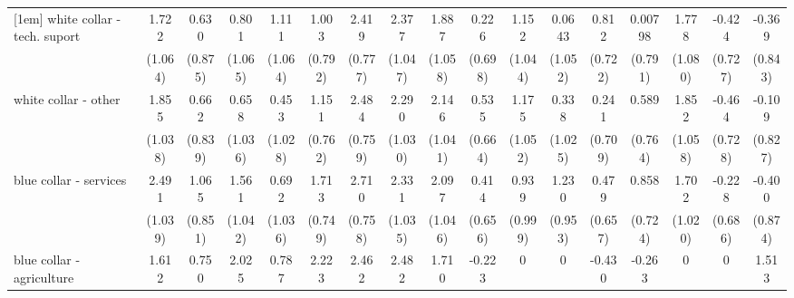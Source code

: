 {\begin{tabular}{l*{16}{c}}
[1em]
white collar - tech. suport&       1.722         &       0.630         &       0.801         &       1.111         &       1.003         &       2.419\sym{**} &       2.377\sym{*}  &       1.887         &       0.226         &       1.152         &      0.0643         &       0.812         &     0.00798         &       1.778         &      -0.424         &      -0.369         \\
                    &     (1.064)         &     (0.875)         &     (1.065)         &     (1.064)         &     (0.792)         &     (0.777)         &     (1.047)         &     (1.058)         &     (0.698)         &     (1.044)         &     (1.052)         &     (0.722)         &     (0.791)         &     (1.080)         &     (0.727)         &     (0.843)         \\
[1em]
white collar - other&       1.855         &       0.662         &       0.658         &       0.453         &       1.151         &       2.484\sym{**} &       2.290\sym{*}  &       2.146\sym{*}  &       0.535         &       1.175         &       0.338         &       0.241         &       0.589         &       1.852         &      -0.464         &      -0.109         \\
                    &     (1.038)         &     (0.839)         &     (1.036)         &     (1.028)         &     (0.762)         &     (0.759)         &     (1.030)         &     (1.041)         &     (0.664)         &     (1.052)         &     (1.025)         &     (0.709)         &     (0.764)         &     (1.058)         &     (0.728)         &     (0.827)         \\
[1em]
blue collar - services&       2.491\sym{*}  &       1.065         &       1.561         &       0.692         &       1.713\sym{*}  &       2.710\sym{***}&       2.331\sym{*}  &       2.097\sym{*}  &       0.414         &       0.939         &       1.230         &       0.479         &       0.858         &       1.702         &      -0.228         &      -0.400         \\
                    &     (1.039)         &     (0.851)         &     (1.042)         &     (1.036)         &     (0.749)         &     (0.758)         &     (1.035)         &     (1.046)         &     (0.656)         &     (0.999)         &     (0.953)         &     (0.657)         &     (0.724)         &     (1.020)         &     (0.686)         &     (0.874)         \\
[1em]
blue collar - agriculture&       1.612         &       0.750         &       2.025         &       0.787         &       2.223         &       2.462\sym{*}  &       2.482         &       1.710         &      -0.223         &           0         &           0         &      -0.430         &      -0.263         &           0         &           0         &       1.513         \\

\end{tabular}}
